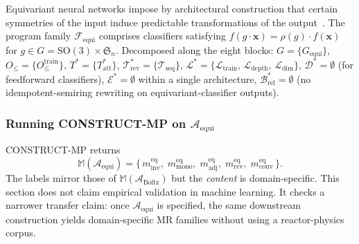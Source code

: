 \documentclass[manuscript]{acmart}
\begin{document}
Equivariant neural networks impose by architectural construction that certain symmetries of the input induce predictable transformations of the output~\cite{CohenWelling2016, ThomasSmidt2018, KondorTrivedi2018, Bronstein2021GDL}. The program family $\mathcal{F}_{\mathrm{equi}}$ comprises classifiers satisfying $f(g\cdot \mathbf{x}) = \rho(g)\cdot f(\mathbf{x})$ for $g \in G = \mathrm{SO}(3) \times \mathfrak{S}_n$. Decomposed along the eight blocks: $G = \{G_{\mathrm{equi}}\}$, $O_{\le} = \{O_{\le}^{\mathrm{train}}\}$, $T^{*} = \{T^{*}_{\mathrm{att}}\}$, $\mathcal{T}^{*}_{\mathrm{rev}} = \{\mathcal{T}_{\mathrm{seq}}\}$, $\mathcal{L}^{*} = \{\mathcal{L}_{\mathrm{train}},\, \mathcal{L}_{\mathrm{depth}},\, \mathcal{L}_{\mathrm{dim}}\}$, $\mathcal{D}^{*} = \emptyset$ (for feedforward classifiers), $\mathcal{E}^{*} = \emptyset$ within a single architecture, $\mathcal{B}^{*}_{\mathrm{rel}} = \emptyset$ (no idempotent-semiring rewriting on equivariant-classifier outputs).

\subsubsection{Running CONSTRUCT-MP on \texorpdfstring{$\mathcal{A}_{\mathrm{equi}}$}{A\_equi}}

CONSTRUCT-MP returns
$$\mathbb{M}(\mathcal{A}_{\mathrm{equi}}) = \bigl\{\,m^{\mathrm{eq}}_{\mathrm{inv}},\; m^{\mathrm{eq}}_{\mathrm{mono}},\; m^{\mathrm{eq}}_{\mathrm{adj}},\; m^{\mathrm{eq}}_{\mathrm{rev}},\; m^{\mathrm{eq}}_{\mathrm{conv}}\,\bigr\}.$$
The labels mirror those of $\mathbb{M}(\mathcal{A}_{\mathrm{Boltz}})$ but the \emph{content} is domain-specific. This section does not claim empirical validation in machine learning. It checks a narrower transfer claim: once $\mathcal{A}_{\mathrm{equi}}$ is specified, the same downstream construction yields domain-specific MR families without using a reactor-physics corpus.
\end{document}
